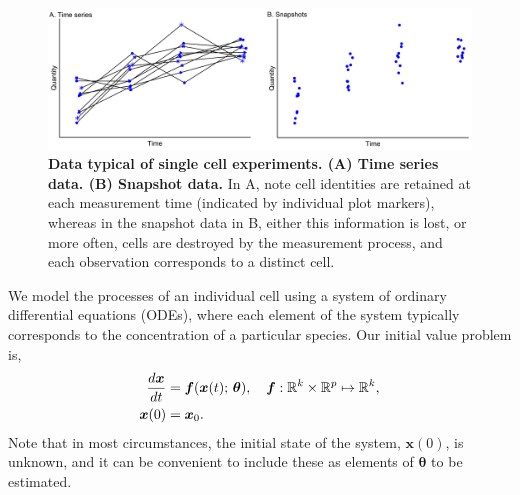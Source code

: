 \begin{figure}[H]
  \centerline{\includegraphics[width=\textwidth]{../figures/time_series_v_snapshots.pdf}}
  \caption{\textbf{Data typical of single cell experiments. (A) Time series data. (B) Snapshot data.} In A, note cell identities are retained at each measurement time (indicated by individual plot markers), whereas in the snapshot data in B, either this information is lost, or more often, cells are destroyed by the measurement process, and each observation corresponds to a distinct cell.}
  \label{fig:time_series_v_snapshots}
\end{figure}

We model the processes of an individual cell using a system of ordinary differential equations (ODEs), where each element of the system typically corresponds to the concentration of a particular species. Our initial value problem is,
%
\begin{equation}\label{eq:ode}
\begin{aligned}
\frac{d\boldsymbol{x}}{dt} &= \boldsymbol{f}(\boldsymbol{x}(t); \, \boldsymbol{\theta}), \quad \boldsymbol{f}: \mathbb{R}^k \times \mathbb{R}^p \mapsto \mathbb{R}^k, \\
\boldsymbol{x}(0) &= \boldsymbol{x}_0.
\end{aligned}
\end{equation}
%
Note that in most circumstances, the initial state of the system, $\boldsymbol{x}(0)$, is unknown, and it can be convenient to include these as elements of $\boldsymbol{\theta}$ to be estimated.

